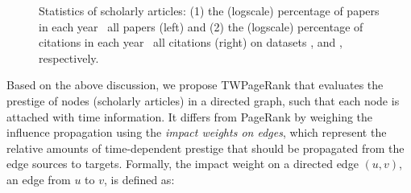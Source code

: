 \begin{figure}
\centering
\hspace{-4ex}
\hspace{-4ex}
\caption{\small Statistics of scholarly articles: (1) the (logscale) percentage of papers in each year \wrt\ all papers (left) and (2) the (logscale) percentage of citations in each year \wrt\ all citations (right) on datasets \aan, \aminer and \magdata, respectively.}
\label{fig-data-analysis}
\vspace{-3ex}
\end{figure}

Based on the above discussion, we propose TWPageRank that evaluates the prestige of nodes (\eg scholarly articles) in a directed graph, such that each node is attached with time information. It differs from PageRank by weighing the influence propagation using the {\em impact weights on edges}, which represent the relative amounts of time-dependent prestige that should be propagated from the edge sources to targets.
%
Formally, the impact weight on a directed edge $(u,v)$, \ie an edge from $u$ to $v$, is defined as:

